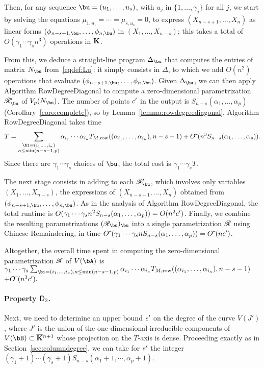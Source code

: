 \documentclass[12pt]{article}
\begin{document}
Then, for any sequence $\bu=(u_1,\dots,u_s)$, with $u_j$ in
$\{1,\dots,\gamma_j\}$ for all $j$, we start by solving the equations
$\mu_{1,u_1} = \cdots = \mu_{s,u_s}=0$, to express
$(X_{n-s+1},\dots,X_n)$ as linear forms
$(\phi_{n-s+1,\bu},\dots,\phi_{n,\bu})$ in $(X_1,\dots,X_{n-s})$; this
takes a total of $O(\gamma_1 \cdots \gamma_s n^3)$ operations in $\mathbf{K}$.

From this, we deduce a straight-line program $\Delta_\bu$ that
computes the entries of matrix $\mN_\bu$ from~\eqref{eqdef:Lu}: it
simply consists in $\Delta$, to which we add $O(n^2)$ operations that
evaluate $(\phi_{n-s+1,\bu},\dots,\phi_{n,\bu})$. Given $\Delta_\bu$, we 
can then apply Algorithm {\sf RowDegreeDiagonal} to compute 
a zero-dimensional parametrization $\scrR'_\bu$ of $V_p(\mN_\bu)$.
The number of points ${c'}{}$ in the output is $S_{n-s}(\alpha_1,\dots,\alpha_p)$
(Corollary~\ref{coro:complete}),
so by Lemma~\ref{lemma:rowdegreediagonal}, Algorithm {\sf RowDegreeDiagonal} takes time 
\begin{eqnarray}
T=\sum_{\substack{\bi=(i_1,\dots,i_\kappa)\\ \kappa\le\min(n-s-1,p)}}
\alpha_{i_1} \cdots \alpha_{i_\kappa} T_{M,{\rm row}}((\alpha_{i_1},\dots,\alpha_{i_\kappa}), n-s-1)
+
\softO(n^3 S_{n-s}(\alpha_1,\dots,\alpha_p)).  \label{eqdef:T}
\end{eqnarray}
Since there are $\gamma_1 \cdots \gamma_s$ choices of $\bu$, 
the total cost is $\gamma_1 \cdots \gamma_s T$.


The next stage consists in adding to each $\scrR'_\bu$, which involves
only variables $(X_1,\dots,X_{n-s})$, the expressions of
$(X_{n-s+1},\dots,X_n)$ obtained from
$(\phi_{n-s+1,\bu},\dots,\phi_{n,\bu})$. As in the analysis of
Algorithm {\sf RowDegreeDiagonal}, the total runtime is $O(\gamma_1
\cdots \gamma_s n^2 S_{n-s}(\alpha_1,\dots,\alpha_p))=O(n^2{c'}{})$. Finally, we
combine the resulting parametrizations $(\scrR_\bu)_\bu$ into a single
parametrization $\mathscr{R}$ using Chinese Remaindering, in time
${O}{\,\tilde{ }\,}(\gamma_1 \cdots \gamma_s n S_{n-s}(\alpha_1,\dots,\alpha_p))={O}{\,\tilde{ }\,}(n{c'}{})$.

Altogether, the overall time spent in computing the zero-dimensional
parametrization $\mathscr{R}$ of $V(\bA)$ is 
$\gamma_1 \cdots \gamma_s\sum_{\substack{\bi=(i_1,\dots,i_\kappa), \kappa\le\min(n-s-1,p)}}
\alpha_{i_1} \cdots \alpha_{i_\kappa} T_{M,{\rm row}}((\alpha_{i_1},\dots,\alpha_{i_\kappa}), n-s-1)$
$+{O}{\,\tilde{ }\,}(n^3 {c'}{}).$




\paragraph{Property $\mathsf{D}_2$.} Next, we need to determine an upper bound 
${e'}{}$ on the degree of the curve $V(J')$, where $J'$ is the union of the
one-dimensional irreducible components of $V(\bB) \subset
\KKbar{}^{n+1}$ whose projection on the $T$-axis is dense. Proceeding
exactly as in Section~\ref{sec:columndegree}, we can take for ${e'}{}$ the
integer $(\gamma_1+1)\cdots(\gamma_s+1) S_{n-s}(\alpha_1 +1,\cdots,\alpha_p+1)$.
\end{document}
